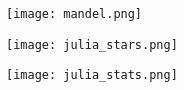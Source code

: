 \documentclass[t]{beamer}
\newcommand\df{\bf\color{Maroon}}
\begin{document}
\begin{frame}[plain]
     \texttt{[image: mandel.png]}
\end{frame}
\begin{frame}[plain]
     \texttt{[image: julia\_stars.png]}
\end{frame}



\begin{frame}[plain]
     \texttt{[image: julia\_stats.png]}
\end{frame}







\end{document}
